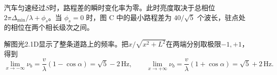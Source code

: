 \documentclass[UTF8,fontset=fandol,a4paper,11pt]{ctexart}
\begin{document}
汽车匀速经过$S$时，路程差的瞬时变化率为零。此时亮度取决于总相位$2\pi\Delta_{\min}/\lambda+\phi_s$。当 $\phi_s=0$ 时，图 C 中的最小路程差为 $40/\sqrt5$ 个波长，驻点处的相位在两个相长级次之间。

解图光2.1D显示了整条道路上的频率。把$x/\sqrt{x^2+L^2}$在两端分别取极限$-1,+1$，得到
\[
\lim_{x\to-\infty}\nu_b=\frac v\lambda(1-\cos\alpha)=\sqrt5-2\,\mathrm{Hz},
\qquad
\lim_{x\to+\infty}\nu_b=\frac v\lambda(1+\cos\alpha)=\sqrt5+2\,\mathrm{Hz}.
\]

\begin{center}\begin{minipage}{.97\linewidth}\centering
{}
\end{minipage}
\end{center}
\end{document}
